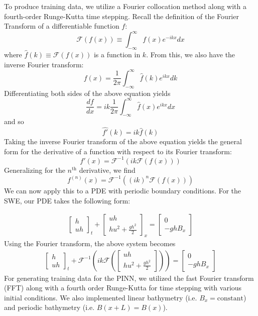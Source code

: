 To produce training data, we utilize a Fourier collocation method along with a fourth-order Runge-Kutta time stepping. 
Recall the definition of the Fourier Transform of a differentiable function $f$:
\[\mathcal{F}(f(x)) \equiv \int_{-\infty}^{\infty}f(x)e^{-ikx}dx\]
where $\hat{f}(k) \equiv \mathcal{F}(f(x))$ is a function in $k$. From this, we also have the inverse Fourier transform:
\[f(x) = \frac{1}{2\pi}\int_{-\infty}^{\infty} \hat{f}(k)e^{ikx}dk\]
Differentiating both sides of the above equation yields
\[\frac{df}{dx} = ik\frac{1}{2\pi}\int_{-\infty}^{\infty}\hat{f}(x)e^{ikx}dx\]
and so
\[\hat{f'}(k) = ik\hat{f}(k)\]
Taking the inverse Fourier transform of the above equation yields the general form for the derivative of a function with respect to its Fourier transform:
\[f'(x) = \mathcal{F}^{-1}(ik\mathcal{F}(f(x)))\]
Generalizing for the $n^{\text{th}}$ derivative, we find
\[f^{(n)}(x) = \mathcal{F}^{-1}((ik)^n\mathcal{F}(f(x)))\]
We can now apply this to a PDE with periodic boundary conditions. For the SWE, our PDE takes the following form:

\begin{align*}
    \begin{bmatrix}
        h\\
        uh
    \end{bmatrix}_t
    + 
    \begin{bmatrix}
        uh\\
        hu^2 + \frac{gh^2}{2}
    \end{bmatrix}_x
    =
    \begin{bmatrix}
        0\\
        -ghB_x
    \end{bmatrix}
\end{align*}    
Using the Fourier transform, the above system becomes
\begin{align*}
    \begin{bmatrix}
        h\\
        uh
    \end{bmatrix}_t
    + 
    \mathcal{F}^{-1}\left(ik\mathcal{F}\left(\begin{bmatrix}
        uh\\
        hu^2 + \frac{gh^2}{2}
    \end{bmatrix} \right)\right)
    = 
    \begin{bmatrix}
        0\\
        -ghB_x
    \end{bmatrix}
\end{align*}
For generating training data for the PINN, we utilized the fast Fourier transform (FFT) along with a fourth order Runge-Kutta for time stepping with various initial conditions. We also implemented linear bathymetry (i.e. $B_x = \text{constant}$) and periodic bathymetry (i.e. $B(x + L) = B(x)$).
\newline\newline


